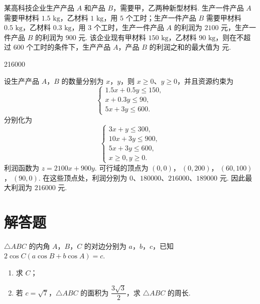 \begin{problem}
某高科技企业生产产品 \(A\) 和产品 \(B\)，需要甲，乙两种新型材料. 生产一件产品 \(A\) 需要甲材料 \(1.5\text{ kg}\)，乙材料 \(1\text{ kg}\)，用 \(5\) 个工时；生产一件产品 \(B\) 需要甲材料 \(0.5\text{ kg}\)，乙材料 \(0.3\text{ kg}\)，用 \(3\) 个工时，生产一件产品 \(A\) 的利润为 \(2100\) 元，生产一件产品 \(B\) 的利润为 \(900\) 元. 该企业现有甲材料 \(150\text{ kg}\)，乙材料 \(90\text{ kg}\)，则在不超过 \(600\) 个工时的条件下，生产产品 \(A\)，产品 \(B\) 的利润之和的最大值为\fillinblank{} 元.
\end{problem}

\begin{answer}
216000
\end{answer}

\begin{solution}
设生产产品 \(A\)，\(B\) 的数量分别为 \(x\)，\(y\)，则 \(x\geqslant0\)、\(y\geqslant0\)，并且资源约束为
\[
\begin{cases}
1.5x+0.5y\leqslant150,\\
x+0.3y\leqslant90,\\
5x+3y\leqslant600.
\end{cases}
\]
分别化为
\[
\begin{cases}
3x+y\leqslant300,\\
10x+3y\leqslant900,\\
5x+3y\leqslant600,\\
x\geqslant0, y\geqslant0.
\end{cases}
\]
利润函数为 \(z=2100x+900y\). 可行域的顶点为
\((0,0)\)，\(\ (0,200)\)，\(\ (60,100)\)，\(\ (90,0)\).
在这些顶点处，利润分别为 \(0\)、\(180000\)、\(216000\)、\(189000\) 元. 因此最大利润为 \(216000\) 元.
\end{solution}


\section{解答题}

\begin{problem}
\(\triangle ABC\) 的内角 \(A\)，\(B\)，\(C\) 的对边分别为 \(a\)，\(b\)，\(c\)，已知 \(2\cos C\left(a\cos B+b\cos A\right)=c\).

\begin{enumerate}
\item 求 \(C\)；
\item 若 \(c=\sqrt7\)，\(\triangle ABC\) 的面积为 \(\dfrac{3\sqrt3}{2}\)，求 \(\triangle ABC\) 的周长.
\end{enumerate}
\end{problem}

